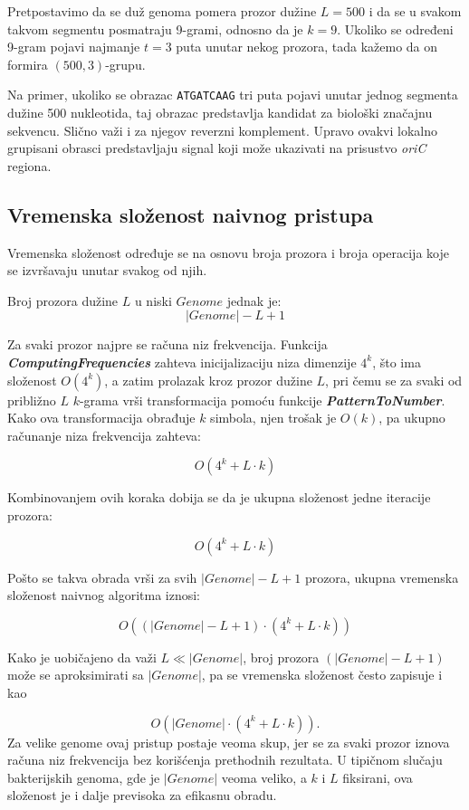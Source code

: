 \documentclass[12pt,oneside]{memoir}
\begin{document}
Pretpostavimo da se duž genoma pomera prozor dužine $L = 500$ i da se u svakom takvom segmentu posmatraju 9-grami, odnosno da je $k = 9$. Ukoliko se određeni 9-gram pojavi najmanje $t = 3$ puta unutar nekog prozora, tada kažemo da on formira $(500,3)$-grupu.

Na primer, ukoliko se obrazac \texttt{ATGATCAAG} tri puta pojavi unutar jednog segmenta dužine 500 nukleotida, taj obrazac predstavlja kandidat za biološki značajnu sekvencu. Slično važi i za njegov reverzni komplement. Upravo ovakvi lokalno grupisani obrasci predstavljaju signal koji može ukazivati na prisustvo \textit{oriC} regiona.



\subsection{Vremenska složenost naivnog pristupa}

Vremenska složenost određuje se na osnovu broja prozora i broja operacija koje se izvršavaju unutar svakog od njih.

Broj prozora dužine $L$ u niski $Genome$ jednak je:
\[
|Genome| - L + 1
\]

Za svaki prozor najpre se računa niz frekvencija. Funkcija \textit{\textbf{ComputingFrequencies}} zahteva inicijalizaciju niza dimenzije $4^k$, što ima složenost $O(4^k)$, a zatim prolazak kroz prozor dužine $L$, pri čemu se za svaki od približno $L$ $k$-grama vrši transformacija pomoću funkcije \textit{\textbf{PatternToNumber}}. Kako ova transformacija obrađuje $k$ simbola, njen trošak je $O(k)$, pa ukupno računanje niza frekvencija zahteva:

\[
O(4^k + L \cdot k)
\]


 Kombinovanjem ovih koraka dobija se da je ukupna složenost jedne iteracije prozora:

\[
O(4^k + L \cdot k)
\]

Pošto se takva obrada vrši za svih $|Genome| - L + 1$ prozora, ukupna vremenska složenost naivnog algoritma iznosi:

\[
O((|Genome| - L + 1)\cdot(4^k + L\cdot k))
\]

Kako je uobičajeno da važi \(L \ll |Genome|\), broj prozora \((|Genome| - L + 1)\) može se aproksimirati sa \(|Genome|\), pa se vremenska složenost često zapisuje i kao

\[
O(|Genome| \cdot (4^k + L \cdot k)).
\]
Za velike genome ovaj pristup postaje veoma skup, jer se za svaki prozor iznova računa niz frekvencija bez korišćenja prethodnih rezultata. U tipičnom slučaju bakterijskih genoma, gde je $|Genome|$ veoma veliko, a $k$ i $L$ fiksirani, ova složenost je i dalje previsoka za efikasnu obradu.
\end{document}
